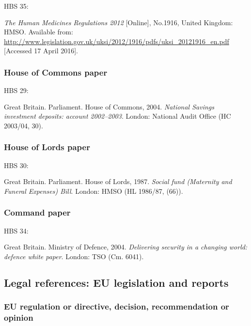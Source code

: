 HBS 35: \cite{gb.hmr2012}

\emph{The Human Medicines Regulations 2012} [Online], No.1916, United Kingdom: HMSO. Available from: \url{http://www.legislation.gov.uk/uksi/2012/1916/pdfs/uksi_20121916_en.pdf} [Accessed 17 April 2016].




\subsubsection*{House of Commons paper}

HBS 29: \cite{gb.hc2003/04-30}

Great Britain. Parliament. House of Commons, 2004. \emph{National Savings investment deposits: account 2002--2003}. London: National Audit Office (HC 2003/04, 30).



\subsubsection*{House of Lords paper}

HBS 30: \cite{gb.hl1986/87-66}

Great Britain. Parliament. House of Lords, 1987. \emph{Social fund (Maternity and Funeral Expenses) Bill}. London: HMSO (HL 1986/87, (66)).



\subsubsection*{Command paper}

HBS 34: \cite{gb.cm6041}

Great Britain. Ministry of Defence, 2004. \emph{Delivering security in a changing world: defence white paper}. London: TSO (Cm. 6041).



\subsection{Legal references: EU legislation and reports}


\subsubsection*{EU regulation or directive, decision, recommendation or opinion}

